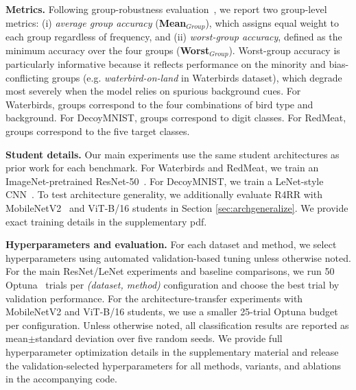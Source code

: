 \textbf{Metrics.} Following group-robustness evaluation~\cite{sagawa2019distributionally}, we report two group-level metrics: (i) \emph{average group accuracy} (\textbf{Mean$_{Group}$}), which assigns equal weight to each group regardless of frequency, and (ii) \emph{worst-group accuracy}, defined as the minimum accuracy over the four groups (\textbf{Worst$_{Group}$}). Worst-group accuracy is particularly informative because it reflects performance on the minority and bias-conflicting groups (e.g. \emph{waterbird-on-land} in Waterbirds dataset), which degrade most severely when the model relies on spurious background cues. For Waterbirds, groups correspond to the four combinations of bird type and background. For DecoyMNIST, groups correspond to digit classes. For RedMeat, groups correspond to the five target classes. 

\textbf{Student details.} Our main experiments use the same student architectures as prior work for each benchmark. For Waterbirds and RedMeat, we train an ImageNet-pretrained ResNet-50~\cite{he2016deep}. For DecoyMNIST, we train a LeNet-style CNN~\cite{lecun1998gradient}. To test architecture generality, we additionally evaluate R4RR with MobileNetV2~\cite{sandler2018mobilenetv2} and ViT-B/16 students in Section \ref{sec:archgeneralize}. We provide exact training details in the supplementary pdf. 



\textbf{Hyperparameters and evaluation.}
For each dataset and method, we select hyperparameters using automated validation-based tuning unless otherwise noted. 
For the main ResNet/LeNet experiments and baseline comparisons, we run 50 Optuna~\cite{akiba2019optuna} trials per \emph{(dataset, method)} configuration and choose the best trial by validation performance. 
For the architecture-transfer experiments with MobileNetV2 and ViT-B/16 students, we use a smaller 25-trial Optuna budget per configuration.
Unless otherwise noted, all classification results are reported as mean$\pm$standard deviation over five random seeds.
We provide full hyperparameter optimization details in the supplementary material and release the validation-selected hyperparameters for all methods, variants, and ablations in the accompanying code.


